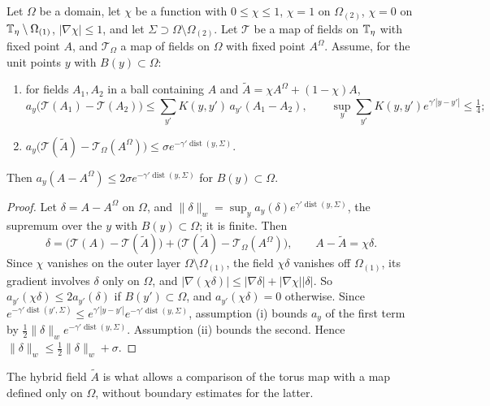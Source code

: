 \begin{lemma}\label{lem:fp-compare}
Let $\Omega$ be a domain, let $\chi$ be a function with $0\le\chi\le1$, $\chi=1$ on $\Omega_{(2)}$, $\chi=0$ on $\mathbb T_\eta\setminus\Omega_{(1)}$, $|\nabla\chi|\le1$, and let $\Sigma\supset\Omega\setminus\Omega_{(2)}$. Let $\mathcal T$ be a map of fields on $\mathbb T_\eta$ with fixed point $A$, and $\mathcal T_\Omega$ a map of fields on $\Omega$ with fixed point $A^\Omega$. Assume, for the unit points $y$ with $B(y)\subset\Omega$:
\begin{enumerate}[label=(\roman*)]
\item for fields $A_1,A_2$ in a ball containing $A$ and $\tilde A=\chi A^\Omega+(1-\chi)A$,
\[
a_y\big(\mathcal T(A_1)-\mathcal T(A_2)\big)\le\sum_{y'}K(y,y')\,a_{y'}(A_1-A_2),\qquad\sup_y\sum_{y'}K(y,y')e^{\gamma'|y-y'|}\le\tfrac14 ;
\]
\item $a_y\big(\mathcal T(\tilde A)-\mathcal T_\Omega(A^\Omega)\big)\le\sigma e^{-\gamma'\operatorname{dist}(y,\Sigma)}$.
\end{enumerate}
Then $a_y(A-A^\Omega)\le2\sigma e^{-\gamma'\operatorname{dist}(y,\Sigma)}$ for $B(y)\subset\Omega$.
\end{lemma}

\begin{proof}
Let $\delta=A-A^\Omega$ on $\Omega$, and $\|\delta\|_w=\sup_ya_y(\delta)e^{\gamma'\operatorname{dist}(y,\Sigma)}$, the supremum over the $y$ with $B(y)\subset\Omega$; it is finite. Then
\[
\delta=\big(\mathcal T(A)-\mathcal T(\tilde A)\big)+\big(\mathcal T(\tilde A)-\mathcal T_\Omega(A^\Omega)\big),\qquad A-\tilde A=\chi\delta .
\]
Since $\chi$ vanishes on the outer layer $\Omega\setminus\Omega_{(1)}$, the field $\chi\delta$ vanishes off $\Omega_{(1)}$, its gradient involves $\delta$ only on $\Omega$, and $|\nabla(\chi\delta)|\le|\nabla\delta|+|\nabla\chi||\delta|$. So $a_{y'}(\chi\delta)\le2a_{y'}(\delta)$ if $B(y')\subset\Omega$, and $a_{y'}(\chi\delta)=0$ otherwise. Since $e^{-\gamma'\operatorname{dist}(y',\Sigma)}\le e^{\gamma'|y-y'|}e^{-\gamma'\operatorname{dist}(y,\Sigma)}$, assumption (i) bounds $a_y$ of the first term by $\frac12\|\delta\|_we^{-\gamma'\operatorname{dist}(y,\Sigma)}$. Assumption (ii) bounds the second. Hence $\|\delta\|_w\le\frac12\|\delta\|_w+\sigma$.
\end{proof}

The hybrid field $\tilde A$ is what allows a comparison of the torus map with a map defined only on $\Omega$, without boundary estimates for the latter.

